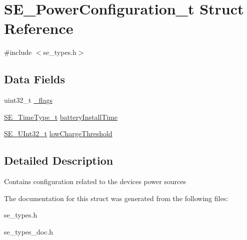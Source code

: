 \hypertarget{structSE__PowerConfiguration__t}{}\section{S\+E\+\_\+\+Power\+Configuration\+\_\+t Struct Reference}
\label{structSE__PowerConfiguration__t}


{\ttfamily \#include $<$se\+\_\+types.\+h$>$}

\subsection*{Data Fields}
\begin{DoxyCompactItemize}
\item 
uint32\+\_\+t \hyperlink{group__PowerConfiguration_gaffb8f5fe39b37d5db62a169a4add7087}{\+\_\+flags}
\item 
\hyperlink{group__TimeType_ga6fba87a5b57829b4ff3f0e7638156682}{S\+E\+\_\+\+Time\+Type\+\_\+t} \hyperlink{group__PowerConfiguration_gabe59076653672547fa38fa99fea40738}{battery\+Install\+Time}
\item 
\hyperlink{group__UInt32_ga70bd4ecda3c0c85d20779d685a270cdb}{S\+E\+\_\+\+U\+Int32\+\_\+t} \hyperlink{group__PowerConfiguration_gaec3de6e5b673fb3fd57c4bcf33491360}{low\+Charge\+Threshold}
\end{DoxyCompactItemize}


\subsection{Detailed Description}
Contains configuration related to the device\textquotesingle{}s power sources 

The documentation for this struct was generated from the following files\+:\begin{DoxyCompactItemize}
\item 
se\+\_\+types.\+h\item 
se\+\_\+types\+\_\+doc.\+h\end{DoxyCompactItemize}
